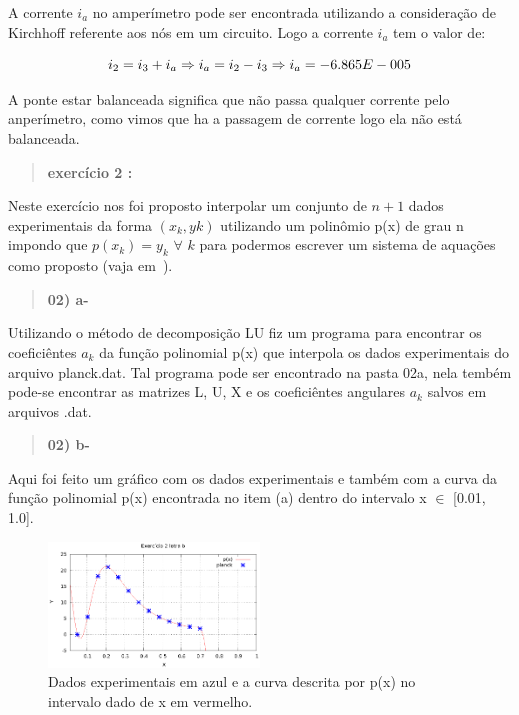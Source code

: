 \documentclass[a4wide]{report}
\begin{document}
A corrente $i_a$ no amperímetro pode ser encontrada utilizando a consideração de Kirchhoff referente aos nós em um circuito.
Logo a corrente $i_a$ tem o valor de:

\begin{equation}
\centering
i_{2} = i_{3} + i_{a} \Rightarrow i_{a} = i_{2} - i_{3} \Rightarrow i_{a} = -6.865E-005
\label{correnteIa}
\end{equation}

A ponte estar balanceada significa que não passa qualquer corrente pelo anperímetro, como vimos que ha a passagem de corrente logo ela não está balanceada.

\begin{quote}

\bf  exercício 2 :

\end{quote}

Neste exercício nos foi proposto interpolar um conjunto de $n+1$ dados experimentais da forma $(x_{k},y{k})$
utilizando um polinômio p(x) de grau n impondo que $p(x_{k}) = y_{k}$ $\forall$ $k$ para podermos escrever um sistema
de aquações como proposto (vaja em~\cite{roteiro}).

\begin{quote}

\bf 02) a- 

\end{quote}

Utilizando o método de decomposição LU fiz um programa para encontrar os coeficiêntes $a_k$ da função polinomial p(x) que interpola
os dados experimentais do arquivo planck.dat. Tal programa pode ser encontrado na pasta 02a, nela tembém pode-se encontrar as matrizes 
L, U, X e os coeficiêntes angulares $a_k$ salvos em arquivos .dat.

\begin{quote}

\bf 02) b- 

\end{quote}

Aqui foi feito um gráfico com os dados experimentais e também com a curva da função polinomial p(x) encontrada no
item (a) dentro do intervalo x $\in $ [0.01, 1.0].

\begin{figure}[h]
\centering
\includegraphics[width=0.5\textwidth]{ex02b}
\caption{Dados experimentais em azul e a curva descrita por p(x) no intervalo dado de x em vermelho.}
\label{ex02b1.1}
\end{figure}
\end{document}
